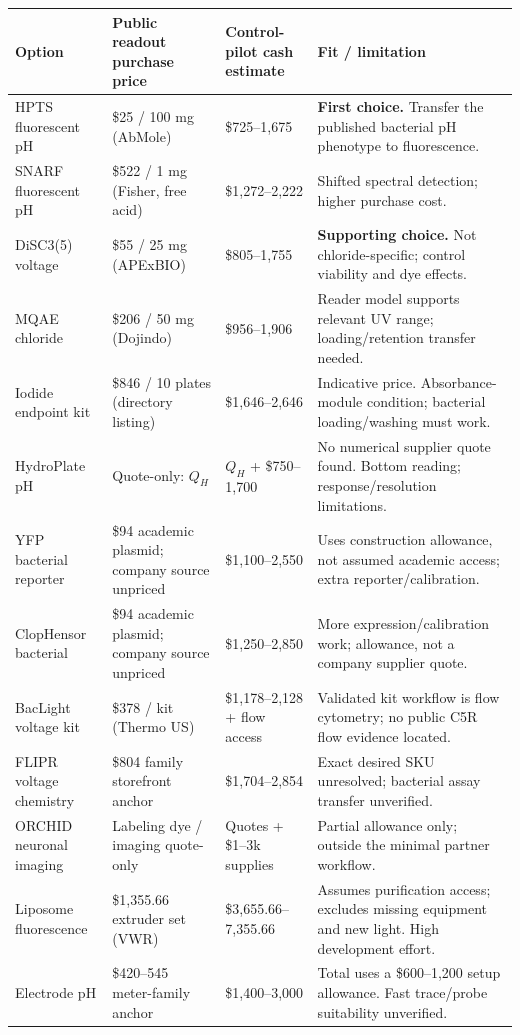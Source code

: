 \documentclass[10pt]{article}
\begin{document}
\small
\begin{tabularx}{\linewidth}{@{}>{\raggedright\arraybackslash}p{1.42in}>{\raggedright\arraybackslash}p{2.05in}>{\raggedright\arraybackslash}p{1.35in}Y@{}}
\toprule
{}\textbf{Option} & \textbf{Public readout purchase price} & \textbf{Control-pilot cash estimate} & \textbf{Fit / limitation} \\
\midrule
{}HPTS fluorescent pH & \$25 / 100 mg (AbMole) & \$725--1,675 & \textbf{First choice.} Transfer the published bacterial pH phenotype to fluorescence. \\
SNARF fluorescent pH & \$522 / 1 mg (Fisher, free acid) & \$1,272--2,222 & Shifted spectral detection; higher purchase cost. \\
DiSC3(5) voltage & \$55 / 25 mg (APExBIO) & \$805--1,755 & \textbf{Supporting choice.} Not chloride-specific; control viability and dye effects. \\
MQAE chloride & \$206 / 50 mg (Dojindo) & \$956--1,906 & Reader model supports relevant UV range; loading/retention transfer needed. \\
Iodide endpoint kit & \$846 / 10 plates (directory listing) & \$1,646--2,646 & Indicative price. Absorbance-module condition; bacterial loading/washing must work. \\
HydroPlate pH & Quote-only: $Q_H$ & $Q_H$ + \$750--1,700 & No numerical supplier quote found. Bottom reading; response/resolution limitations. \\
YFP bacterial reporter & \$94 academic plasmid; company source unpriced & \$1,100--2,550 & Uses construction allowance, not assumed academic access; extra reporter/calibration. \\
ClopHensor bacterial & \$94 academic plasmid; company source unpriced & \$1,250--2,850 & More expression/calibration work; allowance, not a company supplier quote. \\
BacLight voltage kit & \$378 / kit (Thermo US) & \$1,178--2,128 + flow access & Validated kit workflow is flow cytometry; no public C5R flow evidence located. \\
FLIPR voltage chemistry & \$804 family storefront anchor & \$1,704--2,854 & Exact desired SKU unresolved; bacterial assay transfer unverified. \\
ORCHID neuronal imaging & Labeling dye / imaging quote-only & Quotes + \$1--3k supplies & Partial allowance only; outside the minimal partner workflow. \\
Liposome fluorescence & \$1,355.66 extruder set (VWR) & \$3,655.66--7,355.66 & Assumes purification access; excludes missing equipment and new light. High development effort. \\
Electrode pH & \$420--545 meter-family anchor & \$1,400--3,000 & Total uses a \$600--1,200 setup allowance. Fast trace/probe suitability unverified. \\
\bottomrule
\end{tabularx}
\end{document}
